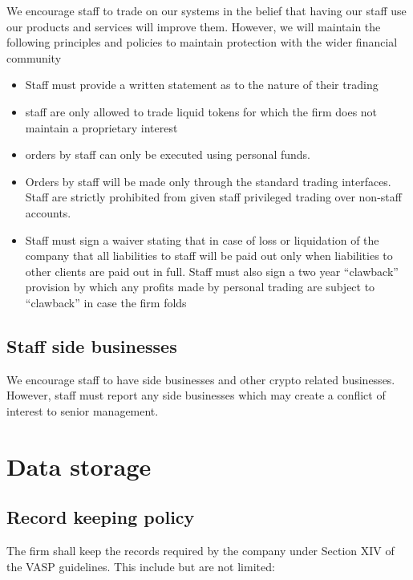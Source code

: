 We encourage staff to trade on our systems in the belief that having
our staff use our products and services will improve them.
However, we will maintain the following principles and policies to
maintain protection with the wider financial community

\begin{itemize}
 \item Staff must provide a written statement as to the nature of
   their trading
  \item staff are only allowed to trade liquid tokens for which the
    firm does not maintain a proprietary interest
  \item orders by staff can only be executed using personal funds.
  \item Orders by staff will be made only through the standard trading
    interfaces.  Staff are strictly prohibited from given staff
    privileged trading over non-staff accounts.
  \item Staff must sign a waiver stating that in case of loss or
    liquidation of the company that all liabilities to staff will be
    paid out only when liabilities to other clients are paid out in
    full.  Staff must also sign a two year ``clawback'' provision by
    which any profits made by personal trading are subject to
    ``clawback'' in case the firm folds
\end{itemize}

\subsection{Staff side businesses}
We encourage staff to have side businesses and other crypto related
businesses.  However, staff must report any side businesses which may
create a conflict of interest to senior management.


\section{Data storage}
\subsection{Record keeping policy}
The firm shall keep the records required by the company under Section
XIV of the VASP guidelines.  This include but are not limited:
\label{label:reckeep}

